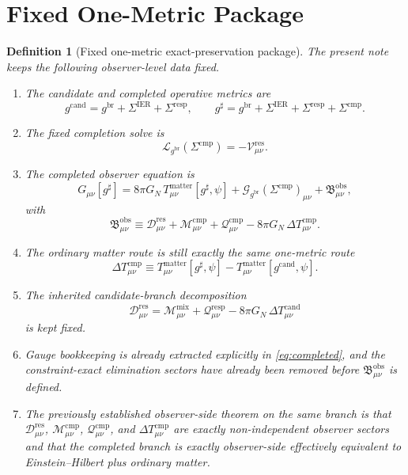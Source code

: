 \documentclass[11pt]{article}
\newcommand{\ObserverMetric}{g^{\mathrm{br}}}
\newcommand{\CandidateMetric}{g^{\mathrm{cand}}}
\newcommand{\CompletedMetric}{g^{\sharp}}
\newcommand{\BaseShift}{\Sigma^{\mathrm{IER}}}
\newcommand{\ResponseShift}{\Sigma^{\mathrm{resp}}}
\newcommand{\CompShift}{\Sigma^{\mathrm{cmp}}}
\newcommand{\ResidualCore}{\mathcal V_{\mu\nu}^{\mathrm{res}}}
\newcommand{\ResidualDec}{\mathcal D_{\mu\nu}^{\mathrm{res}}}
\newcommand{\MixQuad}{\mathcal M_{\mu\nu}^{\mathrm{mix}}}
\newcommand{\RespQuad}{\mathcal Q_{\mu\nu}^{\mathrm{resp}}}
\newcommand{\DeltaTCand}{\Delta T_{\mu\nu}^{\mathrm{cand}}}
\newcommand{\ReducedEin}{\mathcal L_{\ObserverMetric}}
\newcommand{\GaugeBook}{\mathcal G_{\ObserverMetric}}
\newcommand{\CompMix}{\mathcal M_{\mu\nu}^{\mathrm{cmp}}}
\newcommand{\CompQuad}{\mathcal Q_{\mu\nu}^{\mathrm{cmp}}}
\newcommand{\DeltaTComp}{\Delta T_{\mu\nu}^{\mathrm{cmp}}}
\newcommand{\ObsBurden}{\mathfrak B_{\mu\nu}^{\mathrm{obs}}}
\newtheorem{definition}{Definition}
\begin{document}
\section{Fixed One-Metric Package}

\begin{definition}[Fixed one-metric exact-preservation package]
\label{def:fixed}
The present note keeps the following observer-level data fixed.
\begin{enumerate}
    \item The candidate and completed operative metrics are
    \begin{equation}
    \CandidateMetric
    =
    \ObserverMetric+\BaseShift+\ResponseShift,
    \qquad
    \CompletedMetric
    =
    \ObserverMetric+\BaseShift+\ResponseShift+\CompShift.
    \label{eq:metrics}
    \end{equation}
    \item The fixed completion solve is
    \begin{equation}
    \ReducedEin(\CompShift)=-\ResidualCore.
    \label{eq:solve}
    \end{equation}
    \item The completed observer equation is
    \begin{equation}
    G_{\mu\nu}[\CompletedMetric]
    =
    8\pi G_N\,T_{\mu\nu}^{\mathrm{matter}}[\CompletedMetric,\psi]
    +\GaugeBook(\CompShift)_{\mu\nu}
    +\ObsBurden,
    \label{eq:completed}
    \end{equation}
    with
    \begin{equation}
    \ObsBurden
    \equiv
    \ResidualDec+\CompMix+\CompQuad-8\pi G_N\,\DeltaTComp.
    \label{eq:burden}
    \end{equation}
    \item The ordinary matter route is still exactly the same one-metric route
    \begin{equation}
    \DeltaTComp
    \equiv
    T_{\mu\nu}^{\mathrm{matter}}[\CompletedMetric,\psi]
    -
    T_{\mu\nu}^{\mathrm{matter}}[\CandidateMetric,\psi].
    \label{eq:deltatcomp}
    \end{equation}
    \item The inherited candidate-branch decomposition
    \begin{equation}
    \ResidualDec
    =
    \MixQuad+\RespQuad-8\pi G_N\,\DeltaTCand
    \label{eq:resdec}
    \end{equation}
    is kept fixed.
    \item Gauge bookkeeping is already extracted explicitly in \eqref{eq:completed}, and the constraint-exact elimination sectors have already been removed before \(\ObsBurden\) is defined.
    \item The previously established observer-side theorem on the same branch is that \(\ResidualDec\), \(\CompMix\), \(\CompQuad\), and \(\DeltaTComp\) are exactly non-independent observer sectors and that the completed branch is exactly observer-side effectively equivalent to Einstein--Hilbert plus ordinary matter.
\end{enumerate}
\end{definition}
\end{document}
